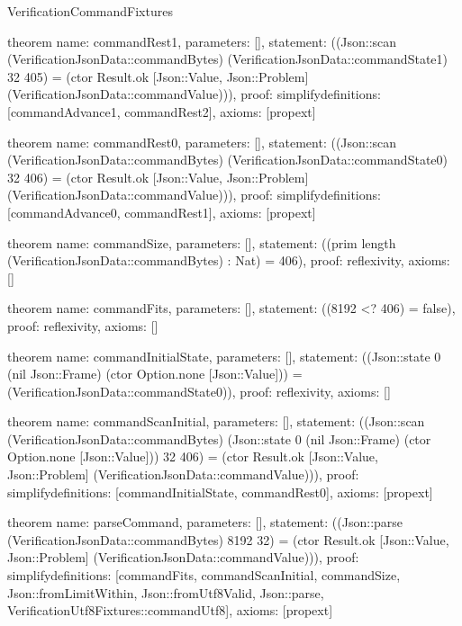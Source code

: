 \begin{lexlean}{VerificationCommandFixtures}
\begin{semanticmodule}
theorem{
  name: commandRest1,
  parameters: [],
  statement: ((Json::scan (VerificationJsonData::commandBytes) (VerificationJsonData::commandState1) 32 405) = (ctor Result.ok [Json::Value, Json::Problem] (VerificationJsonData::commandValue))),
  proof: simplify{definitions: [commandAdvance1, commandRest2]},
  axioms: [propext]
}

theorem{
  name: commandRest0,
  parameters: [],
  statement: ((Json::scan (VerificationJsonData::commandBytes) (VerificationJsonData::commandState0) 32 406) = (ctor Result.ok [Json::Value, Json::Problem] (VerificationJsonData::commandValue))),
  proof: simplify{definitions: [commandAdvance0, commandRest1]},
  axioms: [propext]
}

theorem{
  name: commandSize,
  parameters: [],
  statement: ((prim length (VerificationJsonData::commandBytes) : Nat) = 406),
  proof: reflexivity{},
  axioms: []
}

theorem{
  name: commandFits,
  parameters: [],
  statement: ((8192 <? 406) = false),
  proof: reflexivity{},
  axioms: []
}

theorem{
  name: commandInitialState,
  parameters: [],
  statement: ((Json::state 0 (nil Json::Frame) (ctor Option.none [Json::Value])) = (VerificationJsonData::commandState0)),
  proof: reflexivity{},
  axioms: []
}

theorem{
  name: commandScanInitial,
  parameters: [],
  statement: ((Json::scan (VerificationJsonData::commandBytes) (Json::state 0 (nil Json::Frame) (ctor Option.none [Json::Value])) 32 406) = (ctor Result.ok [Json::Value, Json::Problem] (VerificationJsonData::commandValue))),
  proof: simplify{definitions: [commandInitialState, commandRest0]},
  axioms: [propext]
}

theorem{
  name: parseCommand,
  parameters: [],
  statement: ((Json::parse (VerificationJsonData::commandBytes) 8192 32) = (ctor Result.ok [Json::Value, Json::Problem] (VerificationJsonData::commandValue))),
  proof: simplify{definitions: [commandFits, commandScanInitial, commandSize, Json::fromLimitWithin, Json::fromUtf8Valid, Json::parse, VerificationUtf8Fixtures::commandUtf8]},
  axioms: [propext]
}

\end{semanticmodule}
\end{lexlean}
